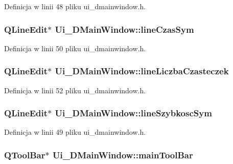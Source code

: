 Definicja w linii 48 pliku ui\-\_\-dmainwindow.\-h.

\hypertarget{class_ui___d_main_window_aad165daf4686baecb2ccd6709c629579}{
\subsubsection[{line\-Czas\-Sym}]{\setlength{\rightskip}{0pt plus 5cm}Q\-Line\-Edit$\ast$ Ui\-\_\-\-D\-Main\-Window\-::line\-Czas\-Sym}}\label{class_ui___d_main_window_aad165daf4686baecb2ccd6709c629579}


Definicja w linii 50 pliku ui\-\_\-dmainwindow.\-h.

\hypertarget{class_ui___d_main_window_a49c95cda7e035087a4367514e5540298}{
\subsubsection[{line\-Liczba\-Czasteczek}]{\setlength{\rightskip}{0pt plus 5cm}Q\-Line\-Edit$\ast$ Ui\-\_\-\-D\-Main\-Window\-::line\-Liczba\-Czasteczek}}\label{class_ui___d_main_window_a49c95cda7e035087a4367514e5540298}


Definicja w linii 52 pliku ui\-\_\-dmainwindow.\-h.

\hypertarget{class_ui___d_main_window_a73bafa5343a8e3cb7cd673a24be76008}{
\subsubsection[{line\-Szybkosc\-Sym}]{\setlength{\rightskip}{0pt plus 5cm}Q\-Line\-Edit$\ast$ Ui\-\_\-\-D\-Main\-Window\-::line\-Szybkosc\-Sym}}\label{class_ui___d_main_window_a73bafa5343a8e3cb7cd673a24be76008}


Definicja w linii 49 pliku ui\-\_\-dmainwindow.\-h.

\hypertarget{class_ui___d_main_window_a2e1da3781ee1e5913b25b85f4c29b97f}{
\subsubsection[{main\-Tool\-Bar}]{\setlength{\rightskip}{0pt plus 5cm}Q\-Tool\-Bar$\ast$ Ui\-\_\-\-D\-Main\-Window\-::main\-Tool\-Bar}}\label{class_ui___d_main_window_a2e1da3781ee1e5913b25b85f4c29b97f}


